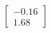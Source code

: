 \documentclass[preview]{standalone}
\begin{document}
\begin{align*}
\begin{bmatrix} -0.16 \\ 1.68 \end{bmatrix}
\end{align*}
\end{document}
